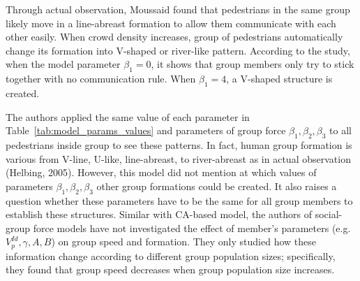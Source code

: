 \documentclass[a4paper,11pt,phdthesis,singlespace,twoside]{cssethesis}
\begin{document}
Through actual observation, Moussaid found that pedestrians in the same group likely move in a line-abreast formation to allow them communicate with each other easily. When crowd density increases, group of pedestrians automatically change its formation into V-shaped or river-like pattern. According to the study, when the model parameter $\beta_{1}=0$, it shows that group members only try to stick together with no communication rule. When $\beta_{1}=4$, a V-shaped structure is created. 

The authors applied the same value of each parameter in Table~\ref{tab:model_params_values} and parameters of group force $\beta_{1}, \beta_{2}, \beta_{3}$ to all pedestrians inside group to see these patterns. In fact, human group formation is various from V-line, U-like, line-abreast, to river-abreast as in actual observation (Helbing, 2005). However, this model did not mention at which values of parameters $\beta_{1}, \beta_{2}, \beta_{3}$ other group formations could be created. It also raises a question whether these parameters have to be the same for all group members to establish these structures. Similar with CA-based model, the authors of social-group force models have not investigated the effect of member’s parameters (e.g. $ V_{p}^{Id}, \gamma, \textit{A}, \textit{B} $) on group speed and formation. They only studied how these information change according to different group population sizes; specifically, they found that group speed decreases when group population size increases. 
\end{document}
